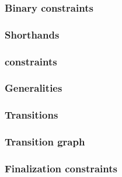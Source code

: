\subsubsection{Binary constraints}                  \label{hub: system: system flags: binary constraints}             
\subsubsection{Shorthands}                          \label{hub: system: system flags: shorthands}                     
\subsubsection{\blockNumber{} constraints}          \label{hub: system: system flags: block number}                   
\subsubsection{Generalities}                        \label{hub: system: system flags: generalities}                   
\subsubsection{Transitions}                         \label{hub: system: system flags: transitions}                    
\subsubsection{Transition graph}                    \label{hub: system: system flags: transition graph}               
\subsubsection{Finalization constraints}            \label{hub: system: system flags: finalization}                   
